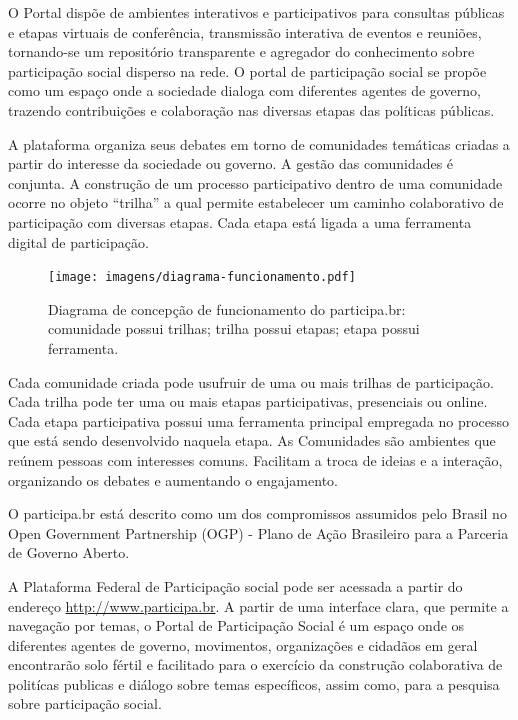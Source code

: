 \documentclass{article}
\begin{document}
O Portal dispõe de ambientes interativos e participativos para consultas
públicas e etapas virtuais de conferência, transmissão interativa de eventos e
reuniões, tornando-se um repositório transparente e agregador do conhecimento
sobre participação social disperso na rede. O portal de participação social se
propõe como um espaço onde a sociedade dialoga com diferentes agentes de
governo, trazendo contribuições e colaboração nas diversas etapas das políticas
públicas.

A plataforma organiza seus debates em torno de comunidades temáticas criadas a
partir do interesse da sociedade ou governo. A gestão das comunidades é
conjunta. A construção de um processo participativo dentro de uma comunidade
ocorre no objeto ``trilha'' a qual permite estabelecer um caminho colaborativo de
participação com diversas etapas. Cada etapa está ligada a uma ferramenta
digital de participação.  

\begin{figure}[h]
  \center
  \texttt{[image: imagens/diagrama-funcionamento.pdf]}
  \caption{Diagrama de concepção de funcionamento do participa.br: comunidade possui trilhas; trilha possui etapas; etapa possui ferramenta.}
  \label{diagrama-funcionamento}
\end{figure}

Cada comunidade criada pode usufruir de uma ou mais trilhas de participação.
Cada trilha pode ter uma ou mais etapas participativas, presenciais ou online.
Cada etapa participativa possui uma ferramenta principal empregada no processo
que está sendo desenvolvido naquela etapa. As Comunidades são ambientes que
reúnem pessoas com interesses comuns. Facilitam a troca de ideias e a
interação, organizando os debates e aumentando o engajamento. 

O participa.br está descrito como um dos compromissos assumidos pelo Brasil no
Open Government Partnership (OGP) - Plano de Ação Brasileiro para a Parceria de
Governo Aberto.

A Plataforma Federal de Participação social pode ser acessada a partir do
endereço \url{http://www.participa.br}. A partir de uma interface clara, que permite
a navegação por temas, o Portal de Participação Social é um espaço onde os
diferentes agentes de governo, movimentos, organizações e cidadãos em geral
encontrarão solo fértil e facilitado para o exercício da construção
colaborativa de politícas publicas e diálogo sobre temas específicos, assim
como, para a pesquisa sobre participação social.
\end{document}
